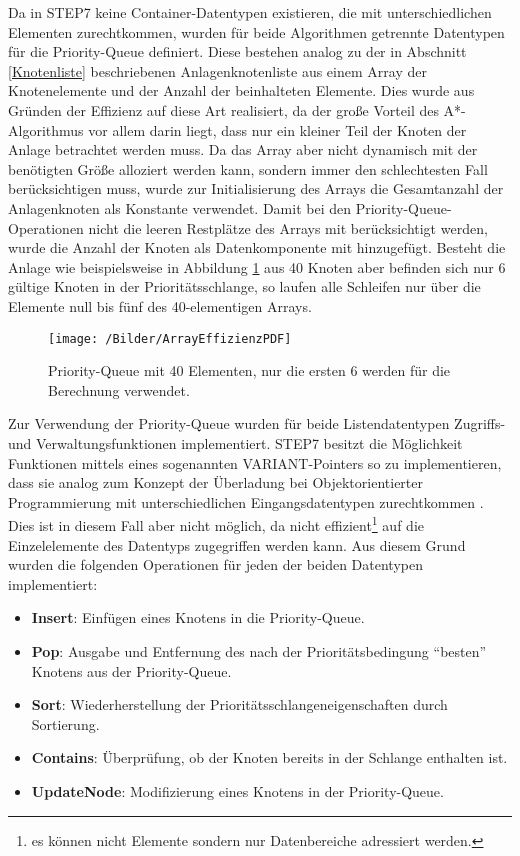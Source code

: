 			Da in \ac{STEP7} keine Container-Datentypen existieren, die mit unterschiedlichen Elementen zurechtkommen, wurden für beide Algorithmen getrennte Datentypen für die Priority-Queue definiert. Diese bestehen analog zu der in Abschnitt \ref{Knotenliste} beschriebenen Anlagenknotenliste aus einem Array der Knotenelemente und der Anzahl der beinhalteten Elemente. Dies wurde aus Gründen der Effizienz auf diese Art realisiert, da der große Vorteil des A*-Algorithmus vor allem darin liegt, dass nur ein kleiner Teil der Knoten der Anlage betrachtet werden muss. Da das Array aber nicht dynamisch mit der benötigten Größe alloziert werden kann, sondern immer den schlechtesten Fall berücksichtigen muss, wurde zur Initialisierung des Arrays die Gesamtanzahl der Anlagenknoten als Konstante verwendet. Damit  bei den Priority-Queue-Operationen nicht die leeren Restplätze des Arrays mit berücksichtigt werden, wurde die Anzahl der Knoten als Datenkomponente mit hinzugefügt. Besteht die Anlage wie beispielsweise in Abbildung \ref{PQEffizienz} aus 40 Knoten aber befinden sich nur 6 gültige Knoten in der Prioritätsschlange, so laufen alle Schleifen nur über die Elemente null bis fünf des 40-elementigen Arrays.
			
			\begin{figure}[h]
				\centering
				\texttt{[image: /Bilder/ArrayEffizienzPDF]}
				\vspace{0.2cm}
				\caption{Priority-Queue mit 40 Elementen, nur die ersten 6 werden für die Berechnung verwendet.}\label{PQEffizienz}
			\end{figure}
			Zur Verwendung der Priority-Queue wurden für beide Listendatentypen Zugriffs- und Verwaltungsfunktionen implementiert. \ac{STEP7} besitzt die Möglichkeit Funktionen mittels eines sogenannten VARIANT-Pointers so zu implementieren, dass sie analog zum Konzept der Überladung bei Objektorientierter Programmierung mit unterschiedlichen Eingangsdatentypen zurechtkommen \cite{STEP7Prog}. Dies ist in diesem Fall aber nicht möglich, da nicht effizient\footnote{es können nicht Elemente sondern nur Datenbereiche adressiert werden.} auf die Einzelelemente des Datentyps zugegriffen werden kann. Aus diesem Grund wurden die folgenden Operationen für jeden der beiden Datentypen implementiert:
			
			\begin{itemize}
				\item \textbf{Insert}: Einfügen eines Knotens in die Priority-Queue.
				\item \textbf{Pop}: Ausgabe und Entfernung des nach der Prioritätsbedingung "`besten"' Knotens aus der Priority-Queue.
				\item \textbf{Sort}: Wiederherstellung der Prioritätsschlangeneigenschaften durch Sortierung.
				\item \textbf{Contains}: Überprüfung, ob der Knoten bereits in der Schlange enthalten ist.
				\item \textbf{UpdateNode}: Modifizierung eines Knotens in der Priority-Queue.
			\end{itemize}
			
